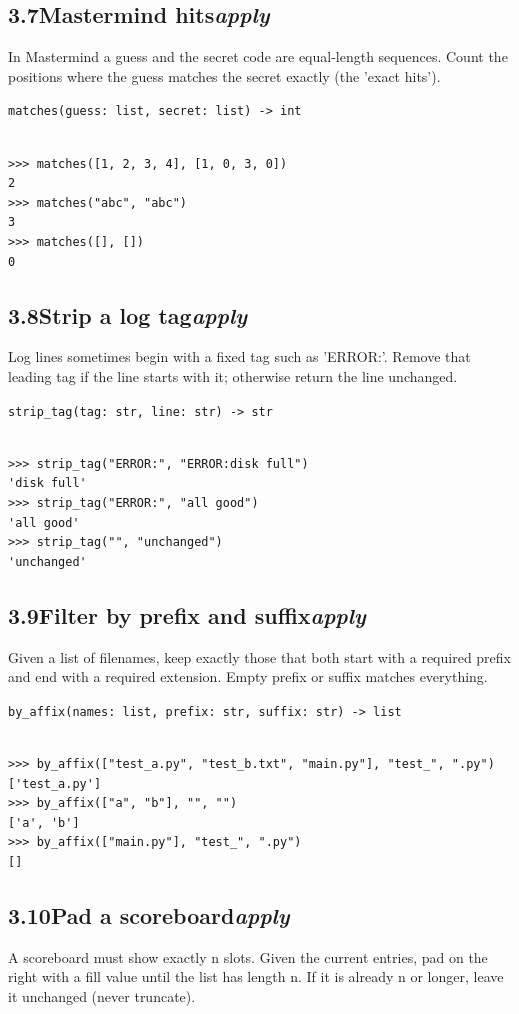 \documentclass[10pt,letterpaper]{book}
\begin{document}
\subsection*{3.7\quad Mastermind hits\hfill\textnormal{\textit{apply}}}
In Mastermind a guess and the secret code are equal-length sequences. Count the positions where the guess matches the secret exactly (the 'exact hits').

\noindent\texttt{matches(guess: list, secret: list) -> int}
\begin{lstlisting}[style=ex]

>>> matches([1, 2, 3, 4], [1, 0, 3, 0])
2
>>> matches("abc", "abc")
3
>>> matches([], [])
0

\end{lstlisting}
\subsection*{3.8\quad Strip a log tag\hfill\textnormal{\textit{apply}}}
Log lines sometimes begin with a fixed tag such as 'ERROR:'. Remove that leading tag if the line starts with it; otherwise return the line unchanged.

\noindent\texttt{strip\_tag(tag: str, line: str) -> str}
\begin{lstlisting}[style=ex]

>>> strip_tag("ERROR:", "ERROR:disk full")
'disk full'
>>> strip_tag("ERROR:", "all good")
'all good'
>>> strip_tag("", "unchanged")
'unchanged'

\end{lstlisting}
\subsection*{3.9\quad Filter by prefix and suffix\hfill\textnormal{\textit{apply}}}
Given a list of filenames, keep exactly those that both start with a required prefix and end with a required extension. Empty prefix or suffix matches everything.

\noindent\texttt{by\_affix(names: list, prefix: str, suffix: str) -> list}
\begin{lstlisting}[style=ex]

>>> by_affix(["test_a.py", "test_b.txt", "main.py"], "test_", ".py")
['test_a.py']
>>> by_affix(["a", "b"], "", "")
['a', 'b']
>>> by_affix(["main.py"], "test_", ".py")
[]

\end{lstlisting}
\subsection*{3.10\quad Pad a scoreboard\hfill\textnormal{\textit{apply}}}
A scoreboard must show exactly n slots. Given the current entries, pad on the right with a fill value until the list has length n. If it is already n or longer, leave it unchanged (never truncate).
\end{document}
